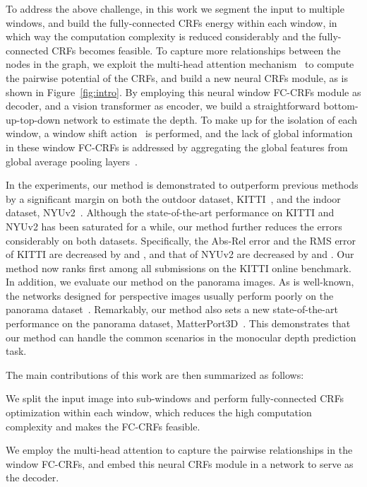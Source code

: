\documentclass[10pt,twocolumn,letterpaper]{article}
\begin{document}
To address the above challenge, in this work we segment the input to multiple windows, and build the fully-connected CRFs energy within each window, in which way the computation complexity is reduced considerably and the fully-connected CRFs becomes feasible.
To capture more relationships between the nodes in the graph, we exploit the multi-head attention mechanism~\cite{vaswani2017attention} to compute the pairwise potential of the CRFs, and build a new neural CRFs module, as is shown in Figure~\ref{fig:intro}.
By employing this neural window FC-CRFs module as decoder, and a vision transformer as encoder, we build a straightforward bottom-up-top-down network to estimate the depth.
To make up for the isolation of each window, a window shift action~\cite{liu2021swin} is performed,
and the lack of global information in these window FC-CRFs is addressed by aggregating the global features from global average pooling layers~\cite{zhao2017pyramid}.


In the experiments, our method is demonstrated to outperform previous methods by a {significant margin} on both the outdoor dataset, KITTI~\cite{geiger2012we}, and the indoor dataset, NYUv2~\cite{silberman2012indoor}.
Although the state-of-the-art performance on KITTI and NYUv2 has been saturated for a while, our method further reduces the errors considerably on both datasets.
Specifically, the Abs-Rel error and the RMS error of KITTI are decreased by  and , and that of NYUv2 are decreased by  and .
Our method now {ranks first} among all submissions on the KITTI online benchmark.
In addition, we evaluate our method on the panorama images.
As is well-known, the networks designed for perspective images usually perform poorly on the panorama dataset~\cite{tateno2018distortion,wang2020bifuse,jiang2021unifuse,sun2021hohonet}.
Remarkably, our method also sets a new state-of-the-art performance on the panorama dataset, MatterPort3D~\cite{chang2017matterport3d}. 
This demonstrates that our method can handle the common scenarios in the monocular depth prediction task.




The main contributions of this work are then summarized as follows:

 We split the input image into sub-windows and perform fully-connected CRFs optimization within each window, which reduces the high computation complexity and makes the FC-CRFs feasible.

 We employ the multi-head attention to capture the pairwise relationships in the window FC-CRFs, and embed this neural CRFs module in a network to serve as the decoder.
\end{document}
